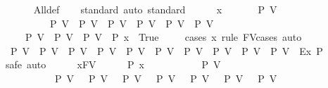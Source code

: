 \begin{isabellebody}
\ \ \ \ \isamarkupfalse%
\ All{\isacharunderscore}{\kern0pt}def\ \isanewline
\ \ \isamarkupfalse%
{\isacharparenleft}{\kern0pt}standard{\isacharcomma}{\kern0pt}\ auto{\isacharcomma}{\kern0pt}\ standard{\isacharparenright}{\kern0pt}\isanewline
\ \ \ \ \isamarkupfalse%
\ x\ \isanewline
\ \ \ \ \isamarkupfalse%
\ {\isachardoublequoteopen}P\ V{}\ {\isasymLongrightarrow}\isanewline
\ \ \ \ \ \ \ \ \ P\ V{}\ {\isasymLongrightarrow}\ P\ V{}\ {\isasymLongrightarrow}\ P\ V{}\ {\isasymLongrightarrow}\ P\ V{}\ {\isasymLongrightarrow}\ P\ V{}\ {\isasymLongrightarrow}\ P\ V{}\ {\isasymLongrightarrow}\ \isanewline
\ \ \ \ P\ V{}\ {\isasymLongrightarrow}\ P\ V{}\ {\isasymLongrightarrow}\ P\ V{}{}\ {\isasymLongrightarrow}\ P\ x\ {\isacharequal}{\kern0pt}\ True{\isachardoublequoteclose}\isanewline
\ \ \ \ \isamarkupfalse%
{\isacharparenleft}{\kern0pt}cases\ x\ rule{\isacharcolon}{\kern0pt}\ FV{\isacharunderscore}{\kern0pt}cases{\isacharcomma}{\kern0pt}\ auto{\isacharparenright}{\kern0pt}\ \isamarkupfalse%
\isanewline
\ \ \isamarkupfalse%
\isanewline
\ \ \isamarkupfalse%
\ {\isachardoublequoteopen}{\isacharparenleft}{\kern0pt}P\ V{}\ {\isasymor}\ P\ V{}\ {\isasymor}\ P\ V{}\ {\isasymor}\ P\ V{}\ {\isasymor}\ P\ V{}\ {\isasymor}\ P\ V{}\ {\isasymor}\ P\ V{}\ {\isasymor}\ P\ V{}\ {\isasymor}\ P\ V{}\ {\isasymor}\ P\ V{}{}{\isacharparenright}{\kern0pt}\ {\isacharequal}{\kern0pt}\ Ex\ P{\isachardoublequoteclose}\isanewline
\ \ \isamarkupfalse%
{\isacharparenleft}{\kern0pt}safe{\isacharcomma}{\kern0pt}\ auto{\isacharparenright}{\kern0pt}\isanewline
\ \ \ \ \isamarkupfalse%
\ x{\isacharcolon}{\kern0pt}{\isacharcolon}{\kern0pt}FV\isanewline
\ \ \ \ \isamarkupfalse%
\ {\isachardoublequoteopen}P\ x\ {\isasymLongrightarrow}\isanewline
\ \ \ \ \ \ \ \ \ {\isasymnot}\ P\ V{}\ {\isasymLongrightarrow}\isanewline
\ \ \ \ \ \ \ \ \ {\isasymnot}\ P\ V{}\ {\isasymLongrightarrow}\ {\isasymnot}\ P\ V{}\ {\isasymLongrightarrow}\ {\isasymnot}\ P\ V{}\ {\isasymLongrightarrow}\ {\isasymnot}\ P\ V{}\ {\isasymLongrightarrow}\ {\isasymnot}\ P\ V{}\ {\isasymLongrightarrow}\ {\isasymnot}\ P\ V{}\ {\isasymLongrightarrow}\ {\isasymnot}\ P\ V{}\ {\isasymLongrightarrow}\ \isanewline

\end{isabellebody}
